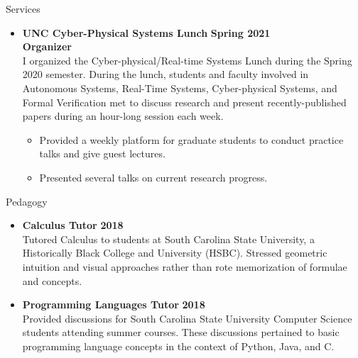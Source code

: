 \documentclass{resume} %
\begin{document}
\begin{rSection}{Services}
\begin{itemize}[leftmargin=*]
      \item
      {\bf UNC Cyber-Physical Systems Lunch } \hfill {\bf Spring 2021}\\
      {\bf Organizer} \\
      I organized the Cyber-physical/Real-time Systems Lunch during the Spring 2020 semester. During the lunch, students and faculty involved in Autonomous Systems, Real-Time Systems, Cyber-physical Systems, and Formal Verification met to discuss research and present recently-published papers during an hour-long session each week.
      \begin{itemize}[label=$\blackdiamond$]
        \item Provided a weekly platform for graduate students to conduct practice talks and give guest lectures.
        \item Presented several talks on current research progress.
      \end{itemize}
\end{itemize}
\end{rSection}

\begin{rSection}{Pedagogy}
  \begin{itemize}[leftmargin=*]
    \item {\bf Calculus Tutor} \hfill {\bf 2018} \\
    Tutored Calculus to students at South Carolina State University, a Historically Black College and University (HSBC). Stressed geometric intuition and visual approaches rather than rote memorization of formulae and concepts.

    \item {\bf Programming Languages Tutor} \hfill {\bf 2018} \\
    Provided discussions for South Carolina State University Computer Science students attending summer courses. These discussions pertained to basic programming language concepts in the context of Python, Java, and C. \\
  \end{itemize}
\end{rSection}
\end{document}
